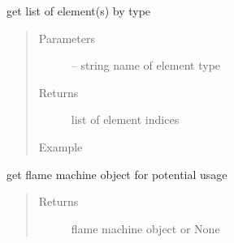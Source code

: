 \documentclass[letterpaper,10pt,english]{sphinxmanual}
\begin{document}
\begin{fulllineitems}
\begin{fulllineitems}
\end{fulllineitems}


\begin{fulllineitems}
\label{\detokenize{src/apidocs/dakopt:genopt.dakopt.DakotaOC.get_elem_by_type}}
get list of element(s) by type
\begin{quote}\begin{description}
\item[{Parameters}] \leavevmode
{} -- string name of element type

\item[{Returns}] \leavevmode
list of element indices

\item[{Example}] \leavevmode
\end{description}\end{quote}

\begin{sphinxVerbatim}[commandchars=\\\{\},formatcom=\scriptsize]
  
  
  
\end{sphinxVerbatim}

\end{fulllineitems}


\begin{fulllineitems}
\label{\detokenize{src/apidocs/dakopt:genopt.dakopt.DakotaOC.get_machine}}
get flame machine object for potential usage
\begin{quote}\begin{description}
\item[{Returns}] \leavevmode
flame machine object or None

\end{description}\end{quote}


\end{fulllineitems}
\end{fulllineitems}
\end{document}
